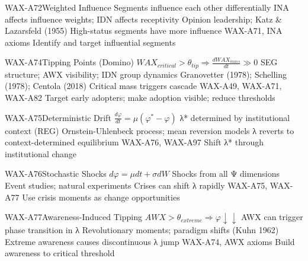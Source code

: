 \begin{axiomspec}{WAX-A72}{Weighted Influence}
 Segments influence each other differentially
 INA affects influence weights; IDN affects receptivity
 Opinion leadership; Katz \& Lazarsfeld (1955)
 High-status segments have more influence
 WAX-A71, INA axioms
 Identify and target influential segments
\end{axiomspec}

\begin{axiomspec}{WAX-A74}{Tipping Points (Domino)}
 $WAX_{critical} > \theta_{tip} \Rightarrow \frac{dWAX_{mass}}{dt} \gg 0$
 SEG structure; AWX visibility; IDN group dynamics
 Granovetter (1978); Schelling (1978); Centola (2018)
 Critical mass triggers cascade
 WAX-A49, WAX-A71, WAX-A82
 Target early adopters; make adoption visible; reduce thresholds
\end{axiomspec}


\begin{axiomspec}{WAX-A75}{Deterministic Drift}
 $\frac{d\varphi}{dt} = \mu(\varphi^* - \varphi)$
 λ* determined by institutional context (REG)
 Ornstein-Uhlenbeck process; mean reversion models
 λ reverts to context-determined equilibrium
 WAX-A76, WAX-A97
 Shift λ* through institutional change
\end{axiomspec}

\begin{axiomspec}{WAX-A76}{Stochastic Shocks}
 $d\varphi = \mu dt + \sigma dW$
 Shocks from all Ψ dimensions
 Event studies; natural experiments
 Crises can shift λ rapidly
 WAX-A75, WAX-A77
 Use crisis moments as change opportunities
\end{axiomspec}

\begin{axiomspec}{WAX-A77}{Awareness-Induced Tipping}
 $AWX > \theta_{extreme} \Rightarrow \varphi \downarrow\downarrow$
 AWX can trigger phase transition in λ
 Revolutionary moments; paradigm shifts (Kuhn 1962)
 Extreme awareness causes discontinuous λ jump
 WAX-A74, AWX axioms
 Build awareness to critical threshold
\end{axiomspec}

